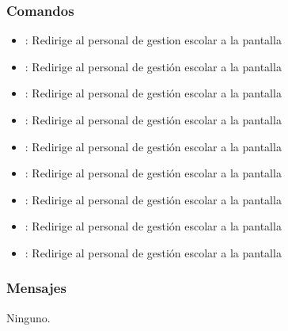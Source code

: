 \subsubsection{Comandos}
\begin{itemize}
	\item {}: Redirige al personal de gestion escolar a la pantalla 
	
	\item {}: Redirige al personal de gestión escolar a la pantalla 
	\item {}: Redirige al personal de gestión escolar a la pantalla 
	
	\item {}: Redirige al personal de gestión escolar a la pantalla 
	\item {}: Redirige al personal de gestión escolar a la pantalla 
	
	\item {}: Redirige al personal de gestión escolar a la pantalla 
	\item {}: Redirige al personal de gestión escolar a la pantalla 
	
	\item {}: Redirige al personal de gestión escolar a la pantalla 
	\item {}: Redirige al personal de gestión escolar a la pantalla 
	
\end{itemize}

\subsubsection{Mensajes}

\begin{Citemize}
	\item Ninguno.
\end{Citemize}

